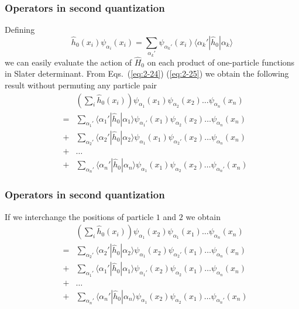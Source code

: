 \documentclass[compress]{beamer}
\newcommand*{\ket}[1]{|#1\rangle}
\newcommand*{\bra}[1]{\langle#1|}
\newcommand{\element}[3]
        {\bra{#1}#2\ket{#3}}
\begin{document}
\frame
{
  \frametitle{Operators in second quantization}
\begin{small}
{\scriptsize
Defining
\begin{equation}
	\hat{h}_0(x_i) \psi_{\alpha_i}(x_i) = \sum_{\alpha_k'} \psi_{\alpha_k'}(x_i) \element{\alpha_k'}{\hat{h}_0}{\alpha_k} \label{eq:2-25}
\end{equation}
we can easily  evaluate the action of $\hat{H}_0$ on each product of one-particle functions in Slater determinant.
From Eqs.~(\ref{eq:2-24}) 
(\ref{eq:2-25})  we obtain the following result without  permuting any particle pair 
\begin{eqnarray}
	&& \left( \sum_i \hat{h}_0(x_i) \right) \psi_{\alpha_1}(x_1)\psi_{\alpha_2}(x_2) \dots \psi_{\alpha_n}(x_n) \nonumber \\
	& =&\sum_{\alpha_1'} \element{\alpha_1'}{\hat{h}_0}{\alpha_1} 
		\psi_{\alpha_1'}(x_1)\psi_{\alpha_2}(x_2) \dots \psi_{\alpha_n}(x_n) \nonumber \\
	&+&\sum_{\alpha_2'} \element{\alpha_2'}{\hat{h}_0}{\alpha_2} 
		\psi_{\alpha_1}(x_1)\psi_{\alpha_2'}(x_2) \dots \psi_{\alpha_n}(x_n) \nonumber \\
	&+& \dots \nonumber \\
	&+&\sum_{\alpha_n'} \element{\alpha_n'}{\hat{h}_0}{\alpha_n} 
		\psi_{\alpha_1}(x_1)\psi_{\alpha_2}(x_2) \dots \psi_{\alpha_n'}(x_n) \label{eq:2-26}
\end{eqnarray}
}
\end{small}
}


\frame
{
  \frametitle{Operators in second quantization}
\begin{small}
{\scriptsize
If we interchange the positions of particle $1$ and $2$  we obtain
\begin{eqnarray}
	&& \left( \sum_i \hat{h}_0(x_i) \right) \psi_{\alpha_1}(x_2)\psi_{\alpha_1}(x_1) \dots \psi_{\alpha_n}(x_n) \nonumber \\
	& =&\sum_{\alpha_2'} \element{\alpha_2'}{\hat{h}_0}{\alpha_2} 
		\psi_{\alpha_1}(x_2)\psi_{\alpha_2'}(x_1) \dots \psi_{\alpha_n}(x_n) \nonumber \\
	&+&\sum_{\alpha_1'} \element{\alpha_1'}{\hat{h}_0}{\alpha_1} 
		\psi_{\alpha_1'}(x_2)\psi_{\alpha_2}(x_1) \dots \psi_{\alpha_n}(x_n) \nonumber \\
	&+& \dots \nonumber \\
	&+&\sum_{\alpha_n'} \element{\alpha_n'}{\hat{h}_0}{\alpha_n} 
		\psi_{\alpha_1}(x_2)\psi_{\alpha_2}(x_1) \dots \psi_{\alpha_n'}(x_n) \label{eq:2-27}
\end{eqnarray}
}
\end{small}
}
\end{document}
